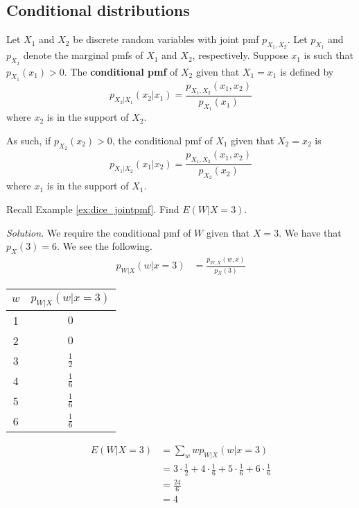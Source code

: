 \subsection{Conditional distributions}

\begin{definition}
	Let $X_1$ and $X_2$ be discrete random variables with joint pmf $p_{X_1,X_2}$. Let $p_{X_1}$ and $p_{X_2}$ denote the marginal pmfs of $X_1$ and $X_2$, respectively. Suppose $x_1$ is such that $p_{X_1}(x_1)>0$. The \textbf{conditional pmf} of $X_2$ given that $X_1=x_1$ is defined by
	$$p_{X_2|X_1}(x_2|x_1)=\frac{p_{X_1,X_2}(x_1,x_2)}{p_{X_1}(x_1)}$$
	where $x_2$ is in the support of $X_2$.
\end{definition}

As such, if $p_{X_2}(x_2)>0$, the conditional pmf of $X_1$ given that $X_2=x_2$ is
$$p_{X_1|X_2}(x_1|x_2)=\frac{p_{X_1,X_2}(x_1,x_2)}{p_{X_2}(x_2)}$$
	where $x_1$ is in the support of $X_1$.

\begin{example}[]
	Recall Example \ref{ex:dice_jointpmf}. Find $E(W|X=3)$.

	\textit{Solution.} We require the conditional pmf of $W$ given that $X=3$. We have that $p_X(3)=6$. We see the following.
	\begin{align*}
		p_{W|X}(w|x=3)&=\frac{p_{W,X}(w,x)}{p_X(3)}
	\end{align*}

	\begin{center}
	\begin{tabular}{c | c}
		$w$ & $p_{W|X}(w|x=3)$\\ \hline
		1 & $0$\\
		2 & $0$\\
		3 & $\frac{1}{2}$\\
		4 & $\frac{1}{6}$\\
		5 & $\frac{1}{6}$\\
		6 & $\frac{1}{6}$
	\end{tabular}
	\end{center}

	\begin{align*}
		E(W|X=3)&=\sum_wwp_{W|X}(w|x=3)\\
		&=3\cdot\frac{1}{2}+4\cdot\frac{1}{6}+5\cdot\frac{1}{6}+6\cdot\frac{1}{6}\\
		&=\frac{24}{6}\\
		&=4
	\end{align*}
\end{example}

